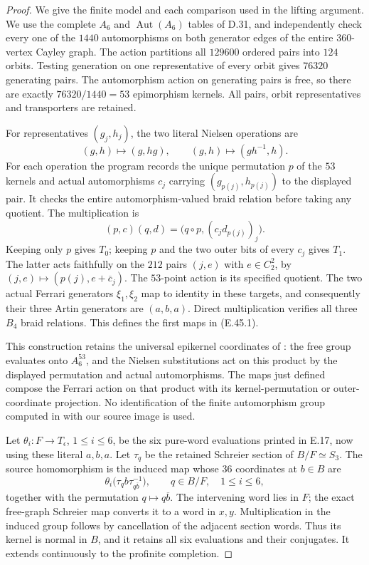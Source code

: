\begin{proof}
We give the finite model and each comparison used in the lifting argument.
We use the complete $A_6$ and $\operatorname{Aut}(A_6)$ tables of D.31,
and independently check every one of the $1440$ automorphisms on
both generator edges of the entire $360$-vertex Cayley graph.
The action partitions all $129600$ ordered pairs into $124$ orbits.
Testing generation on one representative of every orbit gives
$76320$ generating pairs.  The automorphism action on generating
pairs is free, so there are exactly $76320/1440=53$ epimorphism
kernels.  All pairs, orbit representatives and transporters are retained.

For representatives $(g_j,h_j)$, the two literal Nielsen operations are
\[
 (g,h)\longmapsto(g,hg),\qquad
 (g,h)\longmapsto(gh^{-1},h).
 \tag{E.45.6}
\]
For each operation the program records the unique permutation $p$
of the $53$ kernels and actual automorphisms $c_j$ carrying
$(g_{p(j)},h_{p(j)})$ to the displayed pair.  It checks the entire
automorphism-valued braid relation before taking any quotient.
The multiplication is
\[
 (p,c)(q,d)=\bigl(q\circ p,(c_jd_{p(j)})_j\bigr).
 \tag{E.45.7}
\]
Keeping only $p$ gives $T_0$; keeping $p$ and the two outer bits
of every $c_j$ gives $T_1$.  The latter acts faithfully on
the $212$ pairs $(j,e)$ with $e\in C_2^2$, by
$(j,e)\mapsto(p(j),e+\overline c_j)$.
The $53$-point action is its specified quotient.
The two actual Ferrari generators $\xi_1,\xi_2$ map to identity
in these targets, and consequently their three Artin generators
are $(a,b,a)$.  Direct multiplication verifies all three
$B_4$ braid relations.  This defines the first maps in
\textup{(E.45.1)}.

This construction retains the universal epikernel coordinates
of \cite[Lemma 2.1]{DE_Guillot2015}: the free group evaluates
onto $A_6^{53}$, and the Nielsen substitutions act on this
product by the displayed permutation and actual automorphisms.
The maps just defined compose the Ferrari action on that product
with its kernel-permutation or outer-coordinate projection.
No identification of the finite automorphism group computed in
\cite[Theorems 4.9 and 5.2]{DE_Guillot2015} with our source image
is used.

Let $\theta_i:F\to T_\epsilon$, $1\le i\le6$, be the
six pure-word evaluations printed in E.17, now using these
literal $a,b,a$.  Let $\tau_q$ be the retained Schreier section
of $B/F\simeq S_3$.  The source homomorphism is the induced map
whose $36$ coordinates at $b\in B$ are
\[
 \theta_i\bigl(\tau_q b\tau_{q\overline b}^{-1}\bigr),
       \qquad q\in B/F,\quad 1\le i\le6,
 \tag{E.45.8}
\]
together with the permutation $q\mapsto q\overline b$.
The intervening word lies in $F$; the exact free-graph
Schreier map converts it to a word in $x,y$.
Multiplication in the induced group follows by cancellation
of the adjacent section words.  Thus its kernel is normal
in $B$, and it retains all six evaluations and their conjugates.
It extends continuously to the profinite completion.


\end{proof}
